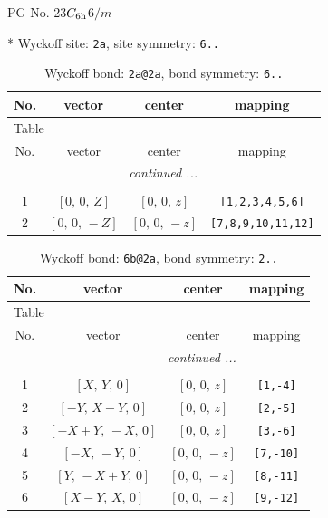 \documentclass[fleqn,8pt]{jsarticle}
\begin{document}
\setcounter{MaxMatrixCols}{32}

\renewcommand{\tablename}{Table~}
\renewcommand{\figurename}{Figure~}
\begin{center}
\LARGE
PG No. 23\quad$C_{\rm 6h}$\quad$6/m$\quad[ hexagonal ]
\end{center}


* Wyckoff site: {\tt 2a}, site symmetry: {\tt 6..}
\renewcommand{\arraystretch}{1.2}
\begin{longtable}{cccc}
\caption{Wyckoff bond: {\tt 2a@2a}, bond symmetry: {\tt 6..}}
 \\
 \hline \hline
No. & vector & center & mapping \\ \hline \endfirsthead

\multicolumn{3}{l}{\tablename\ \thetable{}} \\
 \hline \hline
No. & vector & center & mapping \\ \hline \endhead

 \hline \hline
\multicolumn{3}{r}{\footnotesize\it continued ...} \\ \endfoot

 \hline \hline
\multicolumn{3}{r}{} \\ \endlastfoot

1 & $\left[ 0,\, 0,\, Z \right]$ & $\left[ 0,\, 0,\, z \right]$ & {\tt [1,2,3,4,5,6]} \\ \hline
2 & $\left[ 0,\, 0,\, - Z \right]$ & $\left[ 0,\, 0,\, - z \right]$ & {\tt [7,8,9,10,11,12]} \\
\end{longtable}
\renewcommand{\arraystretch}{1.2}
\begin{longtable}{cccc}
\caption{Wyckoff bond: {\tt 6b@2a}, bond symmetry: {\tt 2..}}
 \\
 \hline \hline
No. & vector & center & mapping \\ \hline \endfirsthead

\multicolumn{3}{l}{\tablename\ \thetable{}} \\
 \hline \hline
No. & vector & center & mapping \\ \hline \endhead

 \hline \hline
\multicolumn{3}{r}{\footnotesize\it continued ...} \\ \endfoot

 \hline \hline
\multicolumn{3}{r}{} \\ \endlastfoot

1 & $\left[ X,\, Y,\, 0 \right]$ & $\left[ 0,\, 0,\, z \right]$ & {\tt [1,-4]} \\ \hline
2 & $\left[ - Y,\, X - Y,\, 0 \right]$ & $\left[ 0,\, 0,\, z \right]$ & {\tt [2,-5]} \\ \hline
3 & $\left[ - X + Y,\, - X,\, 0 \right]$ & $\left[ 0,\, 0,\, z \right]$ & {\tt [3,-6]} \\ \hline
4 & $\left[ - X,\, - Y,\, 0 \right]$ & $\left[ 0,\, 0,\, - z \right]$ & {\tt [7,-10]} \\ \hline
5 & $\left[ Y,\, - X + Y,\, 0 \right]$ & $\left[ 0,\, 0,\, - z \right]$ & {\tt [8,-11]} \\ \hline
6 & $\left[ X - Y,\, X,\, 0 \right]$ & $\left[ 0,\, 0,\, - z \right]$ & {\tt [9,-12]} \\
\end{longtable}
\end{document}
